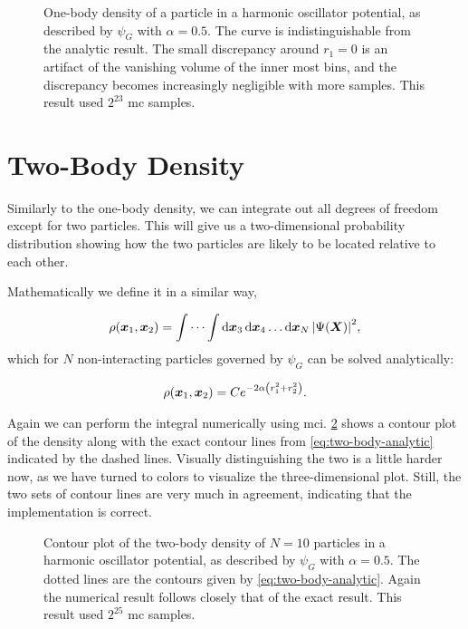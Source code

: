 \documentclass[Thesis.tex]{subfiles}
\begin{document}
\begin{figure}[h]
  \centering
  \resizebox{0.7\linewidth}{!}{%
    
  }
  \caption[One-body density of the ideal harmonic oscillator]{\label{fig:verify-onebody}One-body density of a particle in a
    harmonic oscillator potential, as described by $\psi_G$ with $\alpha=0.5$.
    The curve is indistinguishable from the analytic result. The small
    discrepancy around $r_1=0$ is an artifact of the vanishing volume of the
    inner most bins, and the discrepancy becomes increasingly negligible with
    more samples. This result used $2^{23}$ \gls{mc} samples.}
\end{figure}

\section{Two-Body Density}

Similarly to the one-body density, we can integrate out all degrees of freedom
except for two particles. This will give us a two-dimensional probability
distribution showing how the two particles are likely to be located relative to
each other.

Mathematically we define it in a similar way,

\begin{align}
  \label{eq:two-body-density-def}
  \rho(\bm{x}_1, \bm{x}_2) = \idotsint \dd{\bm{x}_3}\dd{\bm{x}_4}\dots\dd{\bm{x}_N} \abs{\Psi(\bm{X})}^2,
\end{align}
which for $N$ non-interacting particles governed by $\psi_G$ can be solved
analytically:

\begin{align}
  \label{eq:two-body-analytic}
  \rho(\bm{x}_1, \bm{x}_2) = Ce^{-2\alpha\qty(r_1^2 + r_2^2)}.
\end{align}

Again we can perform the integral numerically using \gls{mci}.
\cref{fig:verify-twobody} shows a contour plot of the density along with the
exact contour lines from \cref{eq:two-body-analytic} indicated by the dashed
lines. Visually distinguishing the two is a little harder now, as we have turned
to colors to visualize the three-dimensional plot. Still, the two sets of
contour lines are very much in agreement, indicating that the implementation is
correct.

\begin{figure}[h]
  \centering
  \resizebox{0.7\linewidth}{!}{%
    
  }
  \caption[Two-body density of the ideal harmonic oscillator]{\label{fig:verify-twobody}Contour plot of the two-body density of
$N=10$ particles in a harmonic oscillator potential, as described by $\psi_G$
with $\alpha=0.5$. The dotted lines are the contours given by
\cref{eq:two-body-analytic}. Again the numerical result follows closely that of
the exact result. This result used $2^{25}$ \gls{mc} samples.}
\end{figure}
\end{document}
